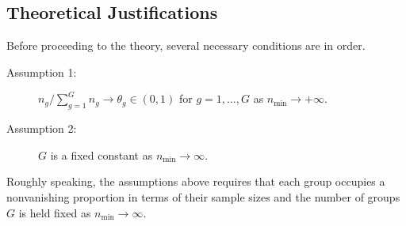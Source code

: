 \documentclass[times,sort&compress,3p]{elsarticle}
\theoremstyle{plain}%
\theoremstyle{definition}
\newcommand{\rsz}[1]{\textcolor{red}{#1}}
\begin{document}
\subsection{Theoretical Justifications} 
Before proceeding to the theory, several necessary conditions are in order.
\begin{description}
  \item[Assumption 1:] $n_g /\sum_{g=1}^{G}n_g \rightarrow \theta_g \in (0, 1)$ for $g=1,\ldots, G$ as $n_{\min} \rightarrow +\infty$. 
  \item[Assumption 2:] $G$ is a fixed constant as $n_{\min} \rightarrow \infty$.
 \end{description}
  Roughly speaking, the assumptions above requires that each group occupies a nonvanishing proportion in terms of their sample sizes and the number of groups $G$ is held fixed as $n_{\min}\to\infty$.
\end{document}
